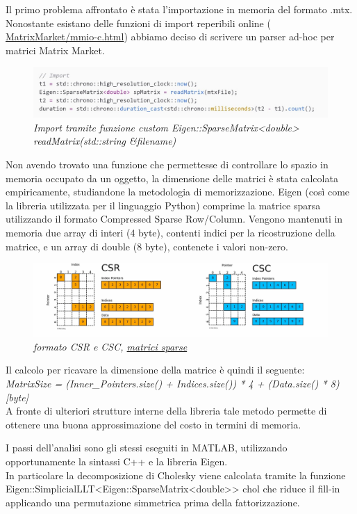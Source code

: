 \documentclass[a4paper,10pt]{article}
\begin{document}
Il primo problema affrontato è stata l’importazione in memoria del formato .mtx. Nonostante esistano delle funzioni di import reperibili online ( \href{https://math.nist.gov/MatrixMarket/mmio-c.html}{MatrixMarket/mmio-c.html}) abbiamo deciso di scrivere un parser ad-hoc per matrici Matrix Market.

\begin{figure}[H]
\centering
\includegraphics[width=0.7\linewidth]{img/c++1.jpg}
\caption{\textit{Import tramite funzione custom Eigen::SparseMatrix<double> readMatrix(std::string \&filename)}}
\end{figure}

Non avendo trovato una funzione che permettesse di controllare lo spazio in memoria occupato da un oggetto, la dimensione delle matrici è stata calcolata empiricamente, studiandone la metodologia di memorizzazione. 
Eigen (così come la libreria utilizzata per il linguaggio Python) comprime la matrice sparsa utilizzando il formato Compressed Sparse Row/Column. Vengono mantenuti in memoria due array di interi (4 byte), contenti indici per la ricostruzione della matrice, e un array di double (8 byte), contenete i valori non-zero.

\begin{figure}[H]
\centering
\includegraphics[width=0.7\linewidth]{img/c++2.jpg}
\caption{\textit{formato CSR e CSC, \href{https://matteding.github.io/2019/04/25/sparse-matrices/} {matrici sparse}}}
\end{figure}

Il calcolo per ricavare la dimensione della matrice è quindi il seguente: \\
\textit{MatrixSize = (Inner\_Pointers.size() + Indices.size()) * 4 + (Data.size() * 8) [byte]} \\

A fronte di ulteriori strutture interne della libreria tale metodo permette di ottenere una buona approssimazione del costo in termini di memoria.

I passi dell’analisi sono gli stessi eseguiti in MATLAB, utilizzando opportunamente la sintassi C++ e la libreria Eigen.\\
In particolare la decomposizione di Cholesky viene calcolata tramite la funzione Eigen::SimplicialLLT<Eigen::SparseMatrix<double>> chol che riduce il fill-in applicando una permutazione simmetrica prima della fattorizzazione. %
\end{document}

